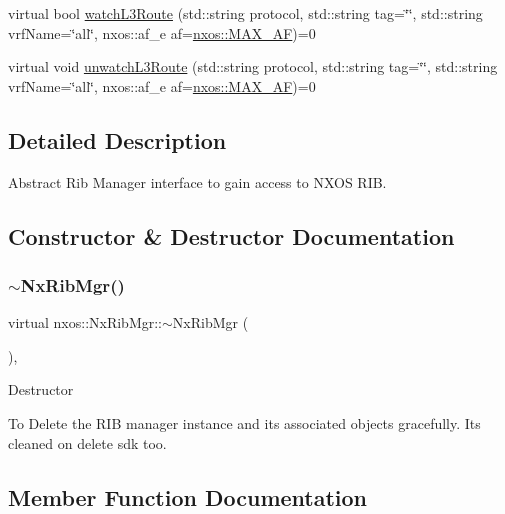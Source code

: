 \begin{DoxyCompactItemize}
virtual bool \mbox{\hyperlink{classnxos_1_1_nx_rib_mgr_ab6749ea02f53fc8b2f6cdba21bbc335d}{watch\+L3\+Route}} (std\+::string protocol, std\+::string tag=\char`\"{}\char`\"{}, std\+::string vrf\+Name=\char`\"{}all\char`\"{}, nxos\+::af\+\_\+e af=\mbox{\hyperlink{namespacenxos_a3a667f48b94db10aa398940dc5bf72d7a18d0f422c857ebdfed79deb2b58ab119}{nxos\+::\+M\+A\+X\+\_\+\+AF}})=0
\item 
virtual void \mbox{\hyperlink{classnxos_1_1_nx_rib_mgr_a1dc61ed1d830f50ea947707576d75b99}{unwatch\+L3\+Route}} (std\+::string protocol, std\+::string tag=\char`\"{}\char`\"{}, std\+::string vrf\+Name=\char`\"{}all\char`\"{}, nxos\+::af\+\_\+e af=\mbox{\hyperlink{namespacenxos_a3a667f48b94db10aa398940dc5bf72d7a18d0f422c857ebdfed79deb2b58ab119}{nxos\+::\+M\+A\+X\+\_\+\+AF}})=0
\end{DoxyCompactItemize}


\subsection{Detailed Description}
Abstract Rib Manager interface to gain access to N\+X\+OS R\+IB. 

\subsection{Constructor \& Destructor Documentation}
\mbox{\label{classnxos_1_1_nx_rib_mgr_a5f390bcc244b9f5984d35290aea0e2cc}} 
\subsubsection{\texorpdfstring{$\sim$\+Nx\+Rib\+Mgr()}{~NxRibMgr()}}
{\footnotesize\ttfamily virtual nxos\+::\+Nx\+Rib\+Mgr\+::$\sim$\+Nx\+Rib\+Mgr (\begin{DoxyParamCaption}{ }\end{DoxyParamCaption})\hspace{0.3cm}{\ttfamily [inline]}, {\ttfamily [virtual]}}

Destructor

To Delete the R\+IB manager instance and its associated objects gracefully. Its cleaned on delete sdk too. 

\subsection{Member Function Documentation}
\mbox{\label{classnxos_1_1_nx_rib_mgr_ae84cf1b9546fc3bf70e12bc7209ca190}} 
